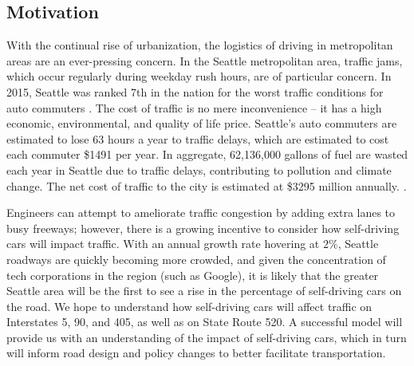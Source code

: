 \subsection{Motivation}
With the continual rise of urbanization, the logistics of driving in metropolitan areas are an ever-pressing concern. In the Seattle metropolitan area, traffic jams, which occur regularly during weekday rush hours, are of particular concern. In 2015, Seattle was ranked 7th in the nation for the worst traffic conditions for auto commuters \cite{Schrank20152015Scorecard}. The cost of traffic is no mere inconvenience -- it has a high economic, environmental, and quality of life price. Seattle's auto commuters are estimated to lose 63 hours a year to traffic delays, which are estimated to cost each commuter \$1491 per year. In aggregate, 62,136,000 gallons of fuel are wasted each year in Seattle due to traffic delays, contributing to pollution and climate change. The net cost of traffic to the city is estimated at \$3295 million annually. \cite{Schrank20152015Scorecard}.

Engineers can attempt to ameliorate traffic congestion by adding extra lanes to busy freeways; however, there is a growing incentive to consider how self-driving cars will impact traffic\cite{BusinessInsider102020}.  With an annual growth rate hovering at $2\%$, Seattle roadways are quickly becoming more crowded, and given the concentration of tech corporations in the region (such as Google), it is likely that the greater Seattle area will be the first to see a rise in the percentage of self-driving cars on the road.  We hope to understand how self-driving cars will affect traffic on Interstates 5, 90, and 405, as well as on State Route 520.  A successful model will provide us with an understanding of the impact of self-driving cars, which in turn will inform road design and policy changes to better facilitate transportation. 
